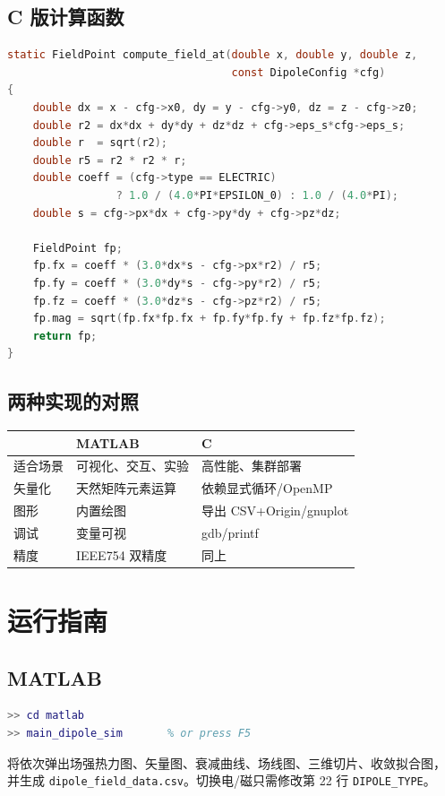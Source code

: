 \documentclass[11pt,a4paper]{article}
\begin{document}
\subsection{C 版计算函数}
\begin{lstlisting}[language=C,caption={dipole\_field.c 关键片段}]
static FieldPoint compute_field_at(double x, double y, double z,
                                   const DipoleConfig *cfg)
{
    double dx = x - cfg->x0, dy = y - cfg->y0, dz = z - cfg->z0;
    double r2 = dx*dx + dy*dy + dz*dz + cfg->eps_s*cfg->eps_s;
    double r  = sqrt(r2);
    double r5 = r2 * r2 * r;
    double coeff = (cfg->type == ELECTRIC)
                 ? 1.0 / (4.0*PI*EPSILON_0) : 1.0 / (4.0*PI);
    double s = cfg->px*dx + cfg->py*dy + cfg->pz*dz;

    FieldPoint fp;
    fp.fx = coeff * (3.0*dx*s - cfg->px*r2) / r5;
    fp.fy = coeff * (3.0*dy*s - cfg->py*r2) / r5;
    fp.fz = coeff * (3.0*dz*s - cfg->pz*r2) / r5;
    fp.mag = sqrt(fp.fx*fp.fx + fp.fy*fp.fy + fp.fz*fp.fz);
    return fp;
}
\end{lstlisting}

\subsection{两种实现的对照}
\begin{center}
\begin{tabular}{@{}lll@{}}\toprule
          & MATLAB & C \\ \midrule
适合场景 & 可视化、交互、实验   & 高性能、集群部署 \\
矢量化 & 天然矩阵元素运算 & 依赖显式循环/OpenMP \\
图形 & 内置绘图             & 导出 CSV+Origin/gnuplot \\
调试 & 变量可视             & gdb/printf \\ 
精度 & IEEE754 双精度       & 同上 \\
\bottomrule
\end{tabular}
\end{center}

\section{运行指南}

\subsection{MATLAB}
\begin{lstlisting}[language=Matlab]
>> cd matlab
>> main_dipole_sim       % or press F5
\end{lstlisting}
将依次弹出场强热力图、矢量图、衰减曲线、场线图、三维切片、收敛拟合图，
并生成 \texttt{dipole\_field\_data.csv}。切换电/磁只需修改第 22 行
\verb|DIPOLE_TYPE|。
\end{document}
